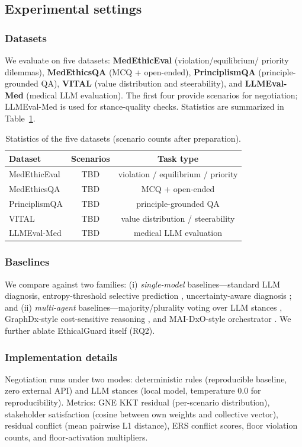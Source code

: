 \documentclass[11pt]{article}
\begin{document}
\subsection{Experimental settings}
\subsubsection{Datasets}
We evaluate on five datasets: \textbf{MedEthicEval} (violation/equilibrium/
priority dilemmas), \textbf{MedEthicsQA} (MCQ + open-ended), \textbf{PrinciplismQA}
(principle-grounded QA), \textbf{VITAL} (value distribution and steerability),
and \textbf{LLMEval-Med} (medical LLM evaluation). The first four provide
scenarios for negotiation; LLMEval-Med is used for stance-quality checks.
Statistics are summarized in Table~\ref{tab:data}.
\begin{table}[t]
  \centering
  \caption{Statistics of the five datasets (scenario counts after
  preparation).}
  \label{tab:data}
  \begin{tabular}{lcc}
    \toprule
    Dataset & Scenarios & Task type \\
    \midrule
    MedEthicEval & TBD & violation / equilibrium / priority \\
    MedEthicsQA & TBD & MCQ + open-ended \\
    PrinciplismQA & TBD & principle-grounded QA \\
    VITAL & TBD & value distribution / steerability \\
    LLMEval-Med & TBD & medical LLM evaluation \\
    \bottomrule
  \end{tabular}
\end{table}
\subsubsection{Baselines}
We compare against two families: (i) \emph{single-model} baselines---standard
LLM diagnosis, entropy-threshold selective prediction \cite{entropy2026},
uncertainty-aware diagnosis \cite{confidx}; and (ii) \emph{multi-agent}
baselines---majority/plurality voting over LLM stances
\cite{utilitarian2025}, GraphDx-style cost-sensitive reasoning \cite{graphdx},
and MAI-DxO-style orchestrator \cite{maidxo}. We further ablate EthicalGuard
itself (RQ2).
\subsubsection{Implementation details}
Negotiation runs under two modes: deterministic rules (reproducible baseline,
zero external API) and LLM stances (local model, temperature 0.0 for
reproducibility). Metrics: GNE KKT residual (per-scenario distribution),
stakeholder satisfaction (cosine between own weights and collective vector),
residual conflict (mean pairwise L1 distance), ERS conflict scores, floor
violation counts, and floor-activation multipliers.
\end{document}
